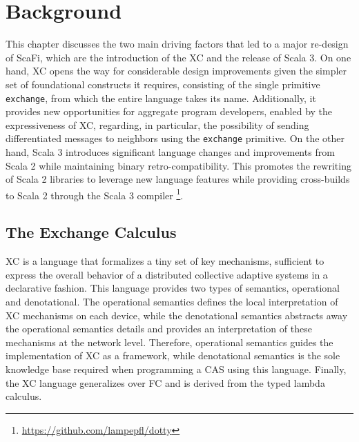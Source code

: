 \chapter{Background}
\label{chap:background}
This chapter discusses the two main driving factors that led to a major re-design of ScaFi, which are the introduction of the \ac{XC} and the release of Scala 3.
%
On one hand, \ac{XC} opens the way for considerable design improvements given the simpler set of foundational constructs it requires, consisting of the single primitive \texttt{exchange}, from which the entire language takes its name.
%
Additionally, it provides new opportunities for aggregate program developers, enabled by the expressiveness of \ac{XC}, regarding, in particular, the possibility of sending differentiated messages to neighbors using the \texttt{exchange} primitive\cite{xc}.
%
On the other hand, Scala 3 introduces significant language changes and improvements from Scala 2 while maintaining binary retro-compatibility.
%
This promotes the rewriting of Scala 2 libraries to leverage new language features while providing cross-builds to Scala 2 through the Scala 3 compiler \footnote{\url{https://github.com/lampepfl/dotty}}.

\section{The Exchange Calculus}\label{chap:background->sec:xc}

\ac{XC} is a language that formalizes a tiny set of key mechanisms, sufficient to express the overall behavior of a distributed collective adaptive systems in a declarative fashion\cite{xc}.
%
This language provides two types of semantics, operational and denotational.
%
The operational semantics defines the local interpretation of \ac{XC} mechanisms on each device, while the denotational semantics abstracts away the operational semantics details and provides an interpretation of these mechanisms at the network level.
%
Therefore, operational semantics guides the implementation of \ac{XC} as a framework, while denotational semantics is the sole knowledge base required when programming a \ac{CAS} using this language.
%
Finally, the \ac{XC} language generalizes over \ac{FC} and is derived from the typed lambda calculus\cite{xc}.

